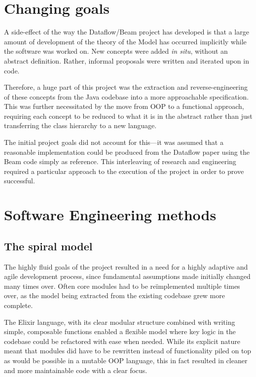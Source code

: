\section{Changing goals}\label{sec:prep:goals}

A side-effect of the way the Dataflow/Beam project has developed is that a large amount of development of the theory of the Model has occurred implicitly while the software was worked on.
New concepts were added \emph{in situ}, without an abstract definition.
Rather, informal proposals were written and iterated upon in code.

Therefore, a huge part of this project was the extraction and reverse-engineering of these concepts from the Java codebase into a more approachable specification.
This was further necessitated by the move from OOP to a functional approach, requiring each concept to be reduced to what it is in the abstract rather than just transferring the class hierarchy to a new language.

The initial project goals did not account for this---it was assumed that a reasonable implementation could be produced from the Dataflow paper \cite{Akidau:2015} using the Beam code simply as reference.
This interleaving of research and engineering required a particular approach to the execution of the project in order to prove successful.


\section{Software Engineering methods}\label{sec:prep:softeng}

\subsection{The spiral model}\label{sec:prep:softeng:spiral}

The highly fluid goals of the project resulted in a need for a highly adaptive and agile development process, since fundamental assumptions made initially changed many times over.
Often core modules had to be re\"implemented multiple times over, as the model being extracted from the existing codebase grew more complete.

The Elixir language, with its clear modular structure combined with writing simple, composable functions enabled a flexible model where key logic in the codebase could be refactored with ease when needed.
While its explicit nature meant that modules did have to be rewritten instead of functionality piled on top as would be possible in a mutable OOP language, this in fact resulted in cleaner and more maintainable code with a clear focus.

